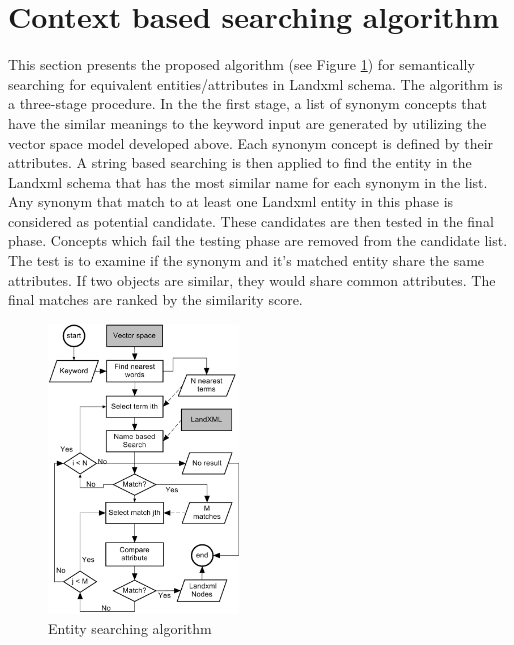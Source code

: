 \documentclass[NewProceedings, InsideFigs]{ascelike} %
\begin{document}
\section{Context based searching algorithm} \label{sec:searching}
This section presents the proposed algorithm (see Figure \ref{fig:search_algorithm}) for semantically searching for equivalent entities/attributes in Landxml schema. The algorithm is a three-stage procedure. In the the first stage, a list of synonym concepts that have the similar meanings to the keyword input are generated by utilizing the vector space model developed above. Each synonym concept is defined by their attributes. A string based searching is then applied to find the entity in the Landxml schema that has the most similar name for each synonym in the list. Any synonym that match to at least one Landxml entity in this phase is considered as potential candidate. These candidates are then tested in the final phase. Concepts which fail the testing phase are removed from the candidate list. The test is to examine if the synonym and it's matched entity share the same attributes. If two objects are similar, they would share common attributes. The final matches are ranked by the similarity score. 



\begin{figure}[t]
\centering
\includegraphics[width=0.45\textwidth]{entity_search_algorithm}
\caption{Entity searching algorithm}
\label{fig:search_algorithm}
\end{figure}
\end{document}
